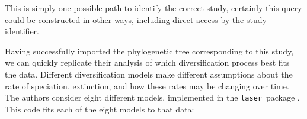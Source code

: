 \documentclass[authoryear, preprint]{elsarticle}
\begin{document}
This is simply one possible path to identify the correct study, certainly this query could be constructed in other ways, including direct access by the study identifier.   


Having successfully imported the phylogenetic tree corresponding to this study,
we can quickly replicate their analysis of which diversification process best fits the data.
Different diversification models make different assumptions about the rate of speciation, extinction,
and how these rates may be changing over time.  
The authors consider eight different models, implemented in the \texttt{laser}~package \citep{Rabosky2006b}.
This code fits each of the eight models to that data:
\end{document}
